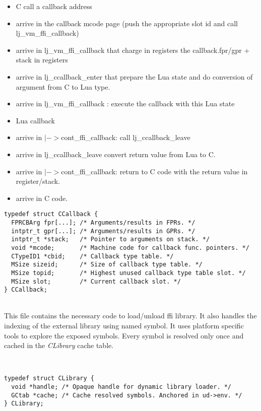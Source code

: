 \begin{itemize}
	\item C call a callback address
	\item arrive in the callback mcode page (push the appropriate slot id and call lj\_vm\_ffi\_callback)
	\item arrive in lj\_vm\_ffi\_callback that charge in registers the callback.fpr/gpr + stack in registers
	\item arrive in lj\_ccallback\_enter that prepare the Lua state and do conversion of argument from C to Lua type.
	\item arrive in lj\_vm\_ffi\_callback : execute the callback with this Lua state
	\item Lua callback
	\item arrive in $|->$cont\_ffi\_callback: call lj\_ccallback\_leave
	\item arrive in lj\_ccallback\_leave convert return value from Lua to C.
	\item arrive in $|->$cont\_ffi\_callback: return to C code with the return value in register/stack.
	\item arrive in C code.
\end{itemize}

\begin{lstlisting}[style=CStyle]
typedef struct CCallback {
  FPRCBArg fpr[...]; /* Arguments/results in FPRs. */
  intptr_t gpr[...]; /* Arguments/results in GPRs. */
  intptr_t *stack;   /* Pointer to arguments on stack. */
  void *mcode;       /* Machine code for callback func. pointers. */
  CTypeID1 *cbid;    /* Callback type table. */
  MSize sizeid;      /* Size of callback type table. */
  MSize topid;       /* Highest unused callback type table slot. */
  MSize slot;        /* Current callback slot. */
} CCallback;
\end{lstlisting}

\\
This file contains the necessary code to load/unload ffi library. It also handles
the indexing of the external library using named symbol. It uses platform
specific tools to explore the exposed symbols. Every symbol is resolved only once
and cached in the \emph{CLibrary} cache table.

\\
\begin{lstlisting}[style=CStyle]
typedef struct CLibrary {
  void *handle; /* Opaque handle for dynamic library loader. */
  GCtab *cache; /* Cache resolved symbols. Anchored in ud->env. */
} CLibrary;
\end{lstlisting}


